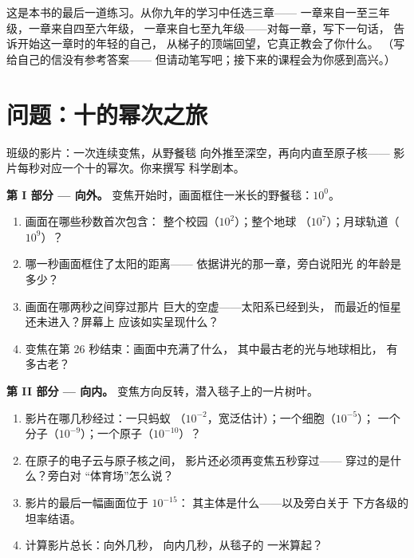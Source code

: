 \begin{exercise}[$\star\star\star$]\label{exo:g9:atoms-to-galaxies:12}
这是本书的最后一道练习。从你九年的学习中任选三章——
一章来自一至三年级，一章来自四至六年级，
一章来自七至九年级——对每一章，写下一句话，
告诉开始这一章时的年轻的自己，
从梯子的顶端回望，它真正教会了你什么。
（写给自己的信没有参考答案——
但请动笔写吧；接下来的课程会为你感到高兴。）
\end{exercise}

\section{问题：十的幂次之旅}

\begin{problem}\label{pb:g9:atoms-to-galaxies:1}
班级的影片：一次连续变焦，从野餐毯
向外推至深空，再向内直至原子核——
影片每秒对应一个十的幂次。你来撰写
科学剧本。

\medskip\noindent\textbf{第 I 部分 --- 向外。}
变焦开始时，画面框住一米长的野餐毯：$10^{0}$。
\begin{enumerate}
  \item 画面在哪些秒数首次包含：
        整个校园（$10^{2}$）；整个地球
        （$10^{7}$）；月球轨道（$10^{9}$）？
  \item 哪一秒画面框住了太阳的距离——
        依据讲光的那一章，旁白说阳光
        的年龄是多少？
  \item 画面在哪两秒之间穿过那片
        巨大的空虚——太阳系已经到头，
        而最近的恒星还未进入？屏幕上
        应该如实呈现什么？
  \item 变焦在第 $26$ 秒结束：画面中充满了什么，
        其中最古老的光与地球相比，
        有多古老？
\end{enumerate}

\medskip\noindent\textbf{第 II 部分 --- 向内。}
变焦方向反转，潜入毯子上的一片树叶。
\begin{enumerate}[resume]
  \item 影片在哪几秒经过：一只蚂蚁
        （$10^{-2}$，宽泛估计）；一个细胞（$10^{-5}$）；
        一个分子（$10^{-9}$）；一个原子（$10^{-10}$）？
  \item 在原子的电子云与原子核之间，
        影片还必须再变焦五秒穿过——
        穿过的是什么？旁白对
        “体育场”怎么说？
  \item 影片的最后一幅画面位于 $10^{-15}$：
        其主体是什么——以及旁白关于
        下方各级的坦率结语。
  \item 计算影片总长：向外几秒，
        向内几秒，从毯子的
        一米算起？
\end{enumerate}


\end{problem}
